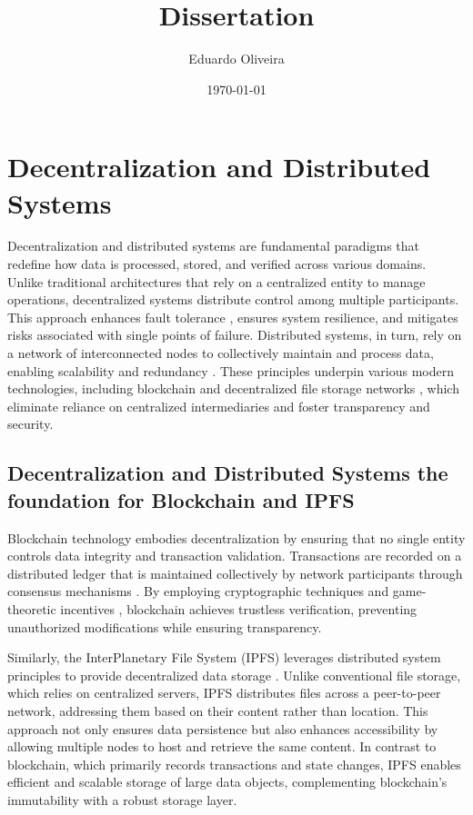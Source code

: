 \documentclass{article}
\title{Dissertation}
\author{Eduardo Oliveira}
\date{\today}
\begin{document}
\maketitle

\section{Decentralization and Distributed Systems}

Decentralization and distributed systems are fundamental paradigms that redefine how data is processed, stored, and verified across various domains. Unlike traditional architectures that rely on a centralized entity to manage operations, decentralized systems distribute control among multiple participants. This approach enhances fault tolerance \cite{lamport1982byzantine}, ensures system resilience, and mitigates risks associated with single points of failure. Distributed systems, in turn, rely on a network of interconnected nodes to collectively maintain and process data, enabling scalability and redundancy \cite{coulouris2011distributed}. These principles underpin various modern technologies, including blockchain \cite{nakamoto2008bitcoin} and decentralized file storage networks \cite{decentralizedstorage2021}, which eliminate reliance on centralized intermediaries and foster transparency and security.


\subsection{Decentralization and Distributed Systems the foundation for Blockchain and IPFS}

Blockchain technology embodies decentralization by ensuring that no single entity controls data integrity and transaction validation. Transactions are recorded on a distributed ledger that is maintained collectively by network participants through consensus mechanisms \cite{nakamoto2008bitcoin}. By employing cryptographic techniques \cite{katz2020introduction} and game-theoretic incentives \cite{roughgarden2016twentyone}, blockchain achieves trustless verification, preventing unauthorized modifications while ensuring transparency.

Similarly, the InterPlanetary File System (IPFS) leverages distributed system principles to provide decentralized data storage \cite{benet2014ipfs}. Unlike conventional file storage, which relies on centralized servers, IPFS distributes files across a peer-to-peer network, addressing them based on their content rather than location. This approach not only ensures data persistence but also enhances accessibility by allowing multiple nodes to host and retrieve the same content. In contrast to blockchain, which primarily records transactions and state changes, IPFS enables efficient and scalable storage of large data objects, complementing blockchain’s immutability with a robust storage layer.
\end{document}
